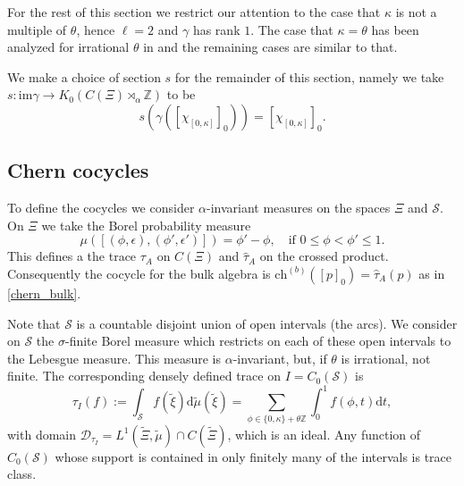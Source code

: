 \documentclass[11pt]{amsart}
\newcommand{\Z}{\mathbb{Z}}
\newcommand{\cut}{\kappa}
\newcommand{\chb}{\text{ch}^{(b)}}
\begin{document}
For the rest of this section we restrict our attention to the case that $\cut$ is not a multiple of $\theta$, hence $\ell=2$ and $\gamma$ has rank $1$. The case that $\cut=\theta$ has been analyzed for irrational $\theta$ in \cite{kellendonk_prodan} and the remaining cases are similar to that.
 
We make a choice of section $s$ for the remainder of this section, namely we take $s:\mathrm{im}\gamma \to K_0(C(\Xi)\rtimes_\alpha\Z)$ to be
\begin{equation}\label{eq-section}
s(\gamma([\chi_{[0, \cut]}]_0)) = [\chi_{[0, \cut]}]_0.
\end{equation}
\subsection{Chern cocycles}
To define the cocycles we consider $\alpha$-invariant measures on the spaces $\Xi$ and $\mathcal S$. On $\Xi$ we take the Borel probability measure 
$$\mu([(\phi,\epsilon),(\phi',\epsilon')])=\phi'-\phi,\quad\mbox{if } 0\leq\phi<\phi'\leq 1.$$
This defines a the trace $\tau_A$  on $C(\Xi)$ and $\hat \tau_A$ on the crossed product. 
Consequently the cocycle for the bulk algebra is 
$  \chb([p]_0)=\hat{\tau}_A(p) $ as in \eqref{chern_bulk}.

Note that $\mathcal S$ is a countable disjoint union of open intervals (the arcs). We consider on $\mathcal S$ the $\sigma$-finite Borel measure which restricts on each of these open intervals to the Lebesgue measure. This measure is $\alpha$-invariant, but, if $\theta$ is irrational, not finite. The corresponding densely defined trace on $I=C_0(\mathcal S)$ is 
\begin{equation}\label{eq-trI}
\tau_I(f) :=  \int_{\mathcal S}f(\tilde{\xi})\mathrm{d}\tilde{\mu}(\tilde{\xi}) = \sum_{\phi\in \{0,\cut\}+\theta\Z} \int_0^1 f(\phi,t)\mathrm{d}t,
\end{equation}
with domain $\mathcal{D}_{\tau_I}=L^1(\tilde\Xi,\tilde\mu)\cap C(\tilde\Xi)$, which is an ideal.
Any function  
of $C_0(\mathcal S)$ whose support is contained in only finitely many of the intervals is trace class. 
\end{document}
